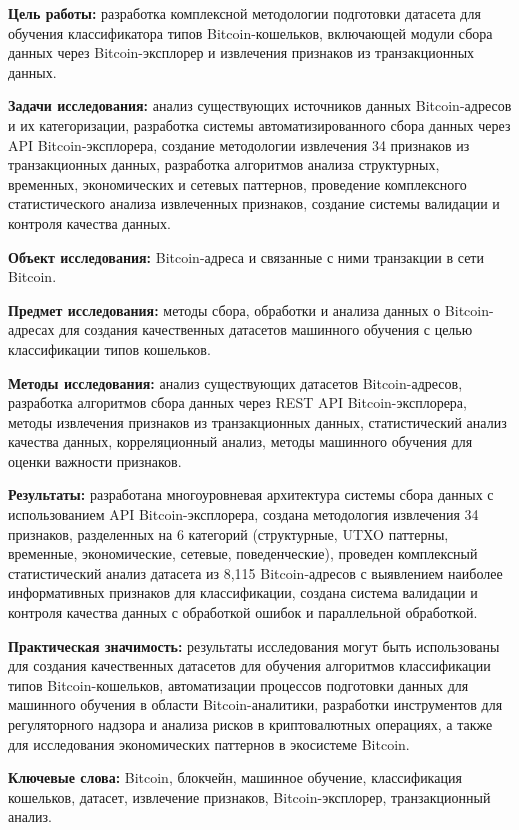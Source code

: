 \abstract %
\textbf{Цель работы:} разработка комплексной методологии подготовки датасета для обучения классификатора типов Bitcoin-кошельков, включающей модули сбора данных через Bitcoin-эксплорер и извлечения признаков из транзакционных данных.

\textbf{Задачи исследования:} анализ существующих источников данных Bitcoin-адресов и их категоризации, разработка системы автоматизированного сбора данных через API Bitcoin-эксплорера, создание методологии извлечения 34 признаков из транзакционных данных, разработка алгоритмов анализа структурных, временных, экономических и сетевых паттернов, проведение комплексного статистического анализа извлеченных признаков, создание системы валидации и контроля качества данных.

\textbf{Объект исследования:} Bitcoin-адреса и связанные с ними транзакции в сети Bitcoin.

\textbf{Предмет исследования:} методы сбора, обработки и анализа данных о Bitcoin-адресах для создания качественных датасетов машинного обучения с целью классификации типов кошельков.

\textbf{Методы исследования:} анализ существующих датасетов Bitcoin-адресов, разработка алгоритмов сбора данных через REST API Bitcoin-эксплорера, методы извлечения признаков из транзакционных данных, статистический анализ качества данных, корреляционный анализ, методы машинного обучения для оценки важности признаков.

\textbf{Результаты:} разработана многоуровневая архитектура системы сбора данных с использованием API Bitcoin-эксплорера, создана методология извлечения 34 признаков, разделенных на 6 категорий (структурные, UTXO паттерны, временные, экономические, сетевые, поведенческие), проведен комплексный статистический анализ датасета из 8,115 Bitcoin-адресов с выявлением наиболее информативных признаков для классификации, создана система валидации и контроля качества данных с обработкой ошибок и параллельной обработкой.

\textbf{Практическая значимость:} результаты исследования могут быть использованы для создания качественных датасетов для обучения алгоритмов классификации типов Bitcoin-кошельков, автоматизации процессов подготовки данных для машинного обучения в области Bitcoin-аналитики, разработки инструментов для регуляторного надзора и анализа рисков в криптовалютных операциях, а также для исследования экономических паттернов в экосистеме Bitcoin.

\textbf{Ключевые слова:} Bitcoin, блокчейн, машинное обучение, классификация кошельков, датасет, извлечение признаков, Bitcoin-эксплорер, транзакционный анализ.